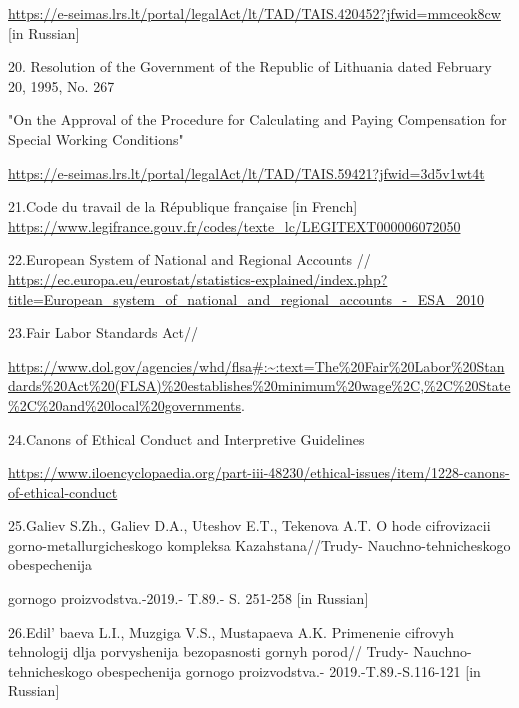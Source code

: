 \begin{references}
\url{https://e-seimas.lrs.lt/portal/legalAct/lt/TAD/TAIS.420452?jfwid=mmceok8cw}
{[}in Russian{]}

20. Resolution of the Government of the Republic of Lithuania dated
February 20, 1995, No. 267

"On the Approval of the Procedure for Calculating and Paying
Compensation for Special Working Conditions"

\url{https://e-seimas.lrs.lt/portal/legalAct/lt/TAD/TAIS.59421?jfwid=3d5v1wt4t}

21.Code du travail de la République française {[}in French{]}
\url{https://www.legifrance.gouv.fr/codes/texte_lc/LEGITEXT000006072050}

22.European System of National and Regional Accounts //
\url{https://ec.europa.eu/eurostat/statistics-explained/index.php?title=European_system_of_national_and_regional_accounts_-_ESA_2010}

23.Fair Labor Standards Act//

\url{https://www.dol.gov/agencies/whd/flsa\#:~:text=The\%20Fair\%20Labor\%20Standards\%20Act\%20(FLSA)\%20establishes\%20minimum\%20wage\%2C,\%2C\%20State\%2C\%20and\%20local\%20governments}.

24.Canons of Ethical Conduct and Interpretive Guidelines

\url{https://www.iloencyclopaedia.org/part-iii-48230/ethical-issues/item/1228-canons-of-ethical-conduct}

25.Galiev S.Zh., Galiev D.A., Uteshov E.T., Tekenova A.T. O hode
cifrovizacii gorno-metallurgicheskogo kompleksa Kazahstana//Trudy-
Nauchno-tehnicheskogo obespechenija

gornogo proizvodstva.-2019.- T.89.- S. 251-258 {[}in Russian{]}

26.Edil' baeva L.I., Muzgiga V.S., Mustapaeva A.K.
Primenenie cifrovyh tehnologij dlja porvyshenija bezopasnosti gornyh
porod// Trudy- Nauchno-tehnicheskogo obespechenija gornogo
proizvodstva.- 2019.-T.89.-S.116-121 {[}in Russian{]}
\end{references}

